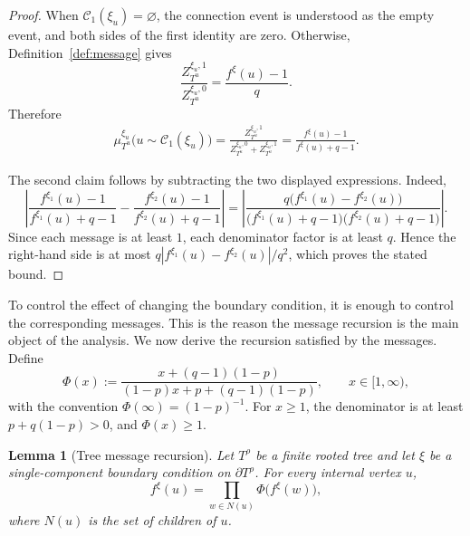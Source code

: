 \documentclass[11pt]{amsart}
\theoremstyle{plain}
\newtheorem{lemma}[theorem]{Lemma}
\theoremstyle{definition}
\theoremstyle{remark}
\begin{document}
\begin{proof}
When $\mathcal C_1(\xi_u)=\varnothing$, the connection event is understood as the empty event, and both sides of the first identity are zero. Otherwise, Definition~\ref{def:message} gives
\[
    \frac{
        Z_{T^u}^{\xi_u,1}
    }{
        Z_{T^u}^{\xi_u,0}
    }
    =
    \frac{
        f^{\xi}(u)-1
    }{q}.
\]
Therefore
\[
\begin{aligned}
    \mu_{T^u}^{\xi_u}
    \bigl(u\sim \mathcal C_1(\xi_u)\bigr)
    =
    \frac{
        Z_{T^u}^{\xi_u,1}
    }{
        Z_{T^u}^{\xi_u,0}
        +
        Z_{T^u}^{\xi_u,1}
    }
    =
    \frac{
        f^{\xi}(u)-1
    }{
        f^{\xi}(u)+q-1
    }.
\end{aligned}
\]

The second claim follows by subtracting the two displayed expressions. Indeed,
\[
\left|
    \frac{f^{\xi_1}(u)-1}
         {f^{\xi_1}(u)+q-1}
    -
    \frac{f^{\xi_2}(u)-1}
         {f^{\xi_2}(u)+q-1}
\right| =
\left|
    \frac{
        q\bigl(f^{\xi_1}(u)
        -
        f^{\xi_2}(u)\bigr)
    }
    {
        \bigl(f^{\xi_1}(u)+q-1\bigr)
        \bigl(f^{\xi_2}(u)+q-1\bigr)
    }
\right|.
\]
Since each message is at least $1$, each denominator factor is at least $q$.  Hence the right-hand side is at most $q|f^{\xi_1}(u)-f^{\xi_2}(u)|/q^2$, which proves the stated bound. 
\end{proof}

To control the effect of changing the boundary condition, it is enough to control the corresponding messages. This is the reason the message recursion is the main object of the analysis.
We now derive the recursion satisfied by the messages. Define
\begin{equation}
\label{eq:Phi}
\Phi(x)
:=
\frac{
    x+(q-1)(1-p)
}{
    (1-p)x+p+(q-1)(1-p)
},
\qquad x\in[1,\infty),
\end{equation}
with the convention $\Phi(\infty)=(1-p)^{-1}$.
For $x\ge1$, the denominator is at least $p+q(1-p)>0$, and $\Phi(x)\ge1$.

\begin{lemma}[Tree message recursion]
\label{lem:tree-message-recursion}
Let \(T^\rho\) be a finite rooted tree and let \(\xi\) be a single-component boundary condition on \(\partial T^\rho\). For every internal vertex \(u\),
\[
    f^{\xi}(u)
    =
    \prod_{w\in N(u)}
    \Phi\bigl(f^{\xi}(w)\bigr),
\]
where \(N(u)\) is the set of children of \(u\).
\end{lemma}
\end{document}
